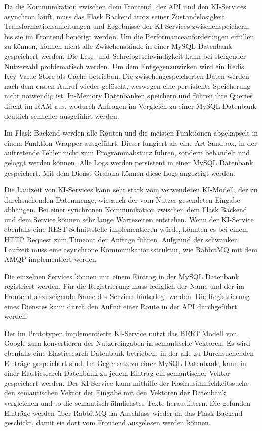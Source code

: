 Da die Kommunikation zwischen dem Frontend, der API und den KI-Services asynchron läuft, muss das Flask Backend trotz seiner Zustandslosigkeit Transformationsanleitungen und Ergebnisse der KI-Services zwischenspeichern, bis sie im Frontend benötigt werden. Um die Performanceanforderungen erfüllen zu können, können nicht alle Zwischenstände in einer MySQL Datenbank gespeichert werden. Die Lese- und Schreibgeschwindigkeit kann bei steigender Nutzerzahl problematisch werden. Um dem Entgegenzuwirken wird ein Redis Key-Value Store als Cache betrieben. Die zwischengespeicherten Daten werden nach dem ersten Aufruf wieder gelöscht, weswegen eine persistente Speicherung nicht notwendig ist. In-Memory Datenbanken speichern und führen ihre Queries direkt im RAM aus, wodurch Anfragen im Vergleich zu einer MySQL Datenbank deutlich schneller ausgeführt werden.

Im Flask Backend werden alle Routen und die meisten Funktionen abgekapselt in einem Funktion Wrapper ausgeführt. Dieser fungiert als eine Art Sandbox, in der auftretende Fehler nicht zum Programmabsturz führen, sondern behandelt und geloggt werden können. Alle Logs werden persistent in einer MySQL Datenbank gespeichert. Mit dem Dienst Grafana können diese Logs angezeigt werden.

Die Laufzeit von KI-Services kann sehr stark vom verwendeten KI-Modell, der zu durchsuchenden Datenmenge, wie auch der vom Nutzer gesendeten Eingabe abhängen. Bei einer synchronen Kommunikation zwischen dem Flask Backend und dem Service können sehr lange Wartezeiten entstehen. Wenn der KI-Service ebenfalls eine REST-Schnittstelle implementieren würde, könnten es bei einem HTTP Request zum Timeout der Anfrage führen. Aufgrund der schwanken Laufzeit muss eine asynchrone Kommunikationsstruktur, wie RabbitMQ mit dem AMQP implementiert werden.

Die einzelnen Services können mit einem Eintrag in der MySQL Datenbank registriert werden. Für die Registrierung muss lediglich der Name und der im Frontend anzuzeigende Name des Services hinterlegt werden. Die Registrierung eines Dienstes kann durch den Aufruf einer Route in der API durchgeführt werden. 

Der im Prototypen implementierte KI-Service nutzt das BERT Modell von Google zum konvertieren der Nutzereingaben in semantische Vektoren. Es wird ebenfalls eine Elasticsearch Datenbank betrieben, in der alle zu Durchsuchenden Einträge gespeichert sind. Im Gegensatz zu einer MySQL Datenbank, kann in einer Elasticsearch Datenbank zu jedem Eintrag ein semantischer Vektor gespeichert werden. Der KI-Service kann mithilfe der Kosinusähnlichkeitssuche den semantischen Vektor der Eingabe mit den Vektoren der Datenbank vergleichen und so die semantisch ähnlichstes Texte herausfiltern. Die gefunden Einträge werden über RabbitMQ im Anschluss wieder an das Flask Backend geschickt, damit sie dort vom Frontend ausgelesen werden können.

